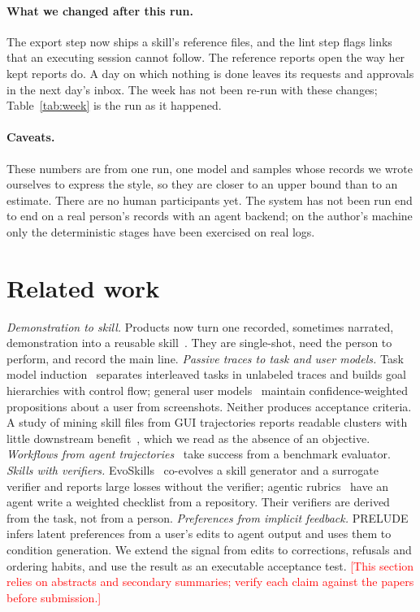 \documentclass[10pt]{article}
\newcommand{\todo}[1]{\textcolor{red}{[#1]}}
\begin{document}
\paragraph{What we changed after this run.} The export step now ships a skill's reference files, and the lint step
flags links that an executing session cannot follow. The reference reports open the way her kept reports do. A
day on which nothing is done leaves its requests and approvals in the next day's inbox. The week has not been
re-run with these changes; Table~\ref{tab:week} is the run as it happened.

\paragraph{Caveats.} These numbers are from one run, one model and samples whose records we wrote ourselves to
express the style, so they are closer to an upper bound than to an estimate. There are no human participants yet.
The system has not been run end to end on a real person's records with an agent backend; on the author's machine
only the deterministic stages have been exercised on real logs.

\section{Related work}
\label{sec:related}

\emph{Demonstration to skill.} Products now turn one recorded, sometimes narrated, demonstration into a reusable
skill~\cite{recordskill,recordreplay,skillrecorder}. They are single-shot, need the person to perform, and record
the main line. \emph{Passive traces to task and user models.} Task model induction~\cite{tmi} separates
interleaved tasks in unlabeled traces and builds goal hierarchies with control flow; general user
models~\cite{gum} maintain confidence-weighted propositions about a user from screenshots. Neither produces
acceptance criteria. A study of mining skill files from GUI trajectories reports readable clusters with little
downstream benefit~\cite{skillmd}, which we read as the absence of an objective. \emph{Workflows from agent
trajectories}~\cite{awm} take success from a benchmark evaluator. \emph{Skills with verifiers.}
EvoSkills~\cite{evoskills} co-evolves a skill generator and a surrogate verifier and reports large losses without
the verifier; agentic rubrics~\cite{rubrics} have an agent write a weighted checklist from a repository. Their
verifiers are derived from the task, not from a person. \emph{Preferences from implicit feedback.}
PRELUDE~\cite{prelude} infers latent preferences from a user's edits to agent output and uses them to condition
generation. We extend the signal from edits to corrections, refusals and ordering habits, and use the result as
an executable acceptance test. \todo{This section relies on abstracts and secondary summaries; verify each claim
against the papers before submission.}
\end{document}
